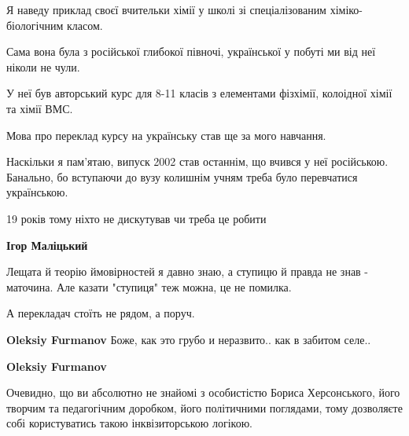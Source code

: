 \begin{itemize}
\begin{itemize}
Я наведу приклад своєї вчительки хімії у школі зі спеціалізованим
хіміко-біологічним класом.

Сама вона була з російської глибокої півночі, української у побуті ми від неї
ніколи не чули.

У неї був авторський курс для 8-11 класів з елементами фізхімії, колоідної
хімії та хімії ВМС.

Мова про переклад курсу на українську став ще за мого навчання.

Наскільки я пам'ятаю, випуск 2002 став останнім, що вчився у неї російською.
Банально, бо вступаючи до вузу колишнім учням треба було перевчатися
українською.

19 років тому ніхто не дискутував чи треба це робити

 
\textbf{Ігор Маліцький} 

Лещата й теорію ймовірностей я давно знаю, а ступицю й правда не знав -
маточина. Але казати "ступиця" теж можна, це не помилка.

А перекладач стоїть не рядом, а поруч.


 
\textbf{Oleksiy Furmanov} Боже, как это грубо и неразвито.. как в забитом селе..

 
\textbf{Oleksiy Furmanov} 

Очевидно, що ви абсолютно не знайомі з особистістю Бориса Херсонського, його
творчим та педагогічним доробком, його політичними поглядами, тому дозволяєте
собі користуватись такою інквізиторською логікою.

\end{itemize}

 


\end{itemize}
